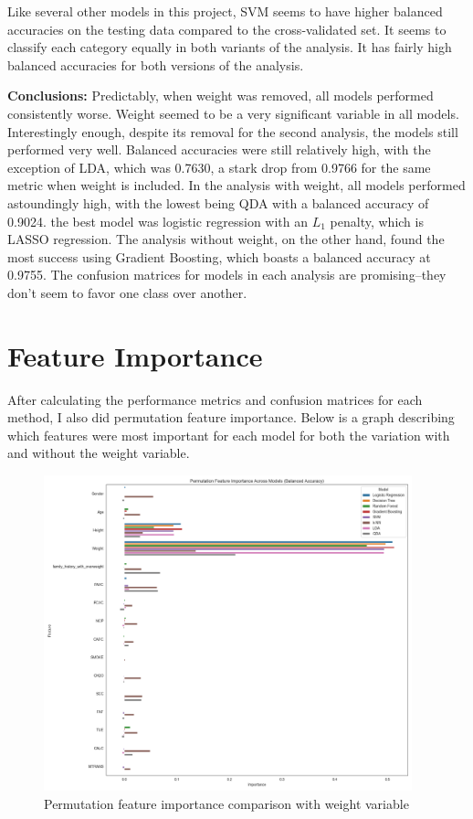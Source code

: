 \documentclass[a4paper,12pt]{article}
\begin{document}
Like several other models in this project, SVM seems to have higher balanced accuracies on the testing data compared to the cross-validated set. It seems to classify each category equally in both variants of the analysis. It has fairly high balanced accuracies for both versions of the analysis.

\textbf{Conclusions:}
Predictably, when weight was removed, all models performed consistently worse. Weight seemed to be a very significant variable in all models. Interestingly enough, despite its removal for the second analysis, the models still performed very well. Balanced accuracies were still relatively high, with the exception of LDA, which was 0.7630, a stark drop from 0.9766 for the same metric when weight is included. In the analysis with weight, all models performed astoundingly high, with the lowest being QDA with a balanced accuracy of 0.9024. the best model was logistic regression with an $L_1$ penalty, which is LASSO regression. The analysis without weight, on the other hand, found the most success using Gradient Boosting, which boasts a balanced accuracy at 0.9755. The confusion matrices for models in each analysis are promising--they don't seem to favor one class over another.

\section{Feature Importance}
After calculating the performance metrics and confusion matrices for each method, I also did permutation feature importance. Below is a graph describing which features were most important for each model for both the variation with and without the weight variable.

\begin{figure}[H]
\centering
\includegraphics[width=0.95\textwidth]{Feature_Importance.png}
\caption{Permutation feature importance comparison with weight variable}
\label{fig:feature_importance}
\end{figure}
\end{document}
